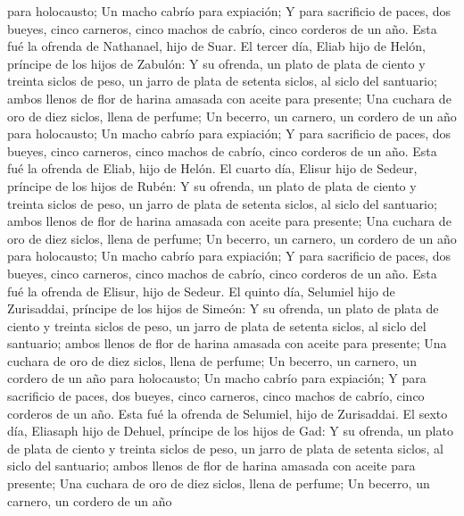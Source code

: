 para holocausto;  Un macho cabrío para expiación;
 Y para sacrificio de paces, dos bueyes, cinco carneros,
cinco machos de cabrío, cinco corderos de un año. Esta fué la ofrenda de
Nathanael, hijo de Suar.  El tercer día, Eliab hijo de
Helón, príncipe de los hijos de Zabulón:  Y su ofrenda,
un plato de plata de ciento y treinta siclos de peso, un jarro de plata
de setenta siclos, al siclo del santuario; ambos llenos de flor de
harina amasada con aceite para presente;  Una cuchara de
oro de diez siclos, llena de perfume;  Un becerro, un
carnero, un cordero de un año para holocausto;  Un macho
cabrío para expiación;  Y para sacrificio de paces, dos
bueyes, cinco carneros, cinco machos de cabrío, cinco corderos de un
año. Esta fué la ofrenda de Eliab, hijo de Helón.  El
cuarto día, Elisur hijo de Sedeur, príncipe de los hijos de Rubén:
 Y su ofrenda, un plato de plata de ciento y treinta
siclos de peso, un jarro de plata de setenta siclos, al siclo del
santuario; ambos llenos de flor de harina amasada con aceite para
presente;  Una cuchara de oro de diez siclos, llena de
perfume;  Un becerro, un carnero, un cordero de un año
para holocausto;  Un macho cabrío para expiación;
 Y para sacrificio de paces, dos bueyes, cinco carneros,
cinco machos de cabrío, cinco corderos de un año. Esta fué la ofrenda de
Elisur, hijo de Sedeur.  El quinto día, Selumiel hijo de
Zurisaddai, príncipe de los hijos de Simeón:  Y su
ofrenda, un plato de plata de ciento y treinta siclos de peso, un jarro
de plata de setenta siclos, al siclo del santuario; ambos llenos de flor
de harina amasada con aceite para presente;  Una cuchara
de oro de diez siclos, llena de perfume;  Un becerro, un
carnero, un cordero de un año para holocausto;  Un macho
cabrío para expiación;  Y para sacrificio de paces, dos
bueyes, cinco carneros, cinco machos de cabrío, cinco corderos de un
año. Esta fué la ofrenda de Selumiel, hijo de Zurisaddai.
 El sexto día, Eliasaph hijo de Dehuel, príncipe de los
hijos de Gad:  Y su ofrenda, un plato de plata de ciento
y treinta siclos de peso, un jarro de plata de setenta siclos, al siclo
del santuario; ambos llenos de flor de harina amasada con aceite para
presente;  Una cuchara de oro de diez siclos, llena de
perfume;  Un becerro, un carnero, un cordero de un año
